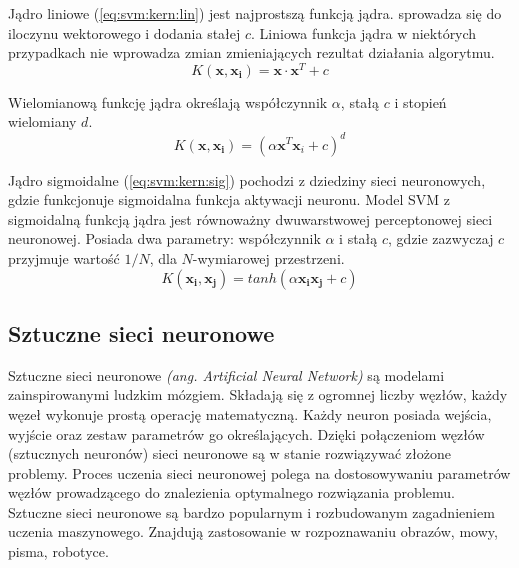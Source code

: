 \documentclass[a4paper,12pt,twoside,openany]{report}
\newcommand{\ang}[1]{\textit{(ang. #1)}}
\newcommand{\Eq}[1]{(\ref{#1})}
\renewcommand{\vec}[1]{\bm{#1}}
\begin{document}
Jądro liniowe \Eq{eq:svm:kern:lin} jest najprostszą funkcją jądra. 
sprowadza się do iloczynu wektorowego i dodania stałej $c$.
Liniowa funkcja jądra w niektórych przypadkach nie wprowadza zmian zmieniających rezultat działania algorytmu.
\begin{equation}
	\label{eq:svm:kern:lin}
	K(\vec x, \vec{x_i}) = \vec x \cdot \vec x ^ T + c
\end{equation}

Wielomianową funkcję jądra określają współczynnik $\alpha$, stałą $c$ i stopień wielomiany $d$.
\begin{equation}
	\label{eq:svm:kern:poly}
	K(\vec x, \vec{x_i}) = (\alpha \vec x^T \vec x_i + c)^d 
\end{equation}

Jądro sigmoidalne \Eq{eq:svm:kern:sig} pochodzi z dziedziny sieci neuronowych,
gdzie funkcjonuje sigmoidalna funkcja aktywacji neuronu. 
Model SVM z sigmoidalną funkcją jądra jest równoważny dwuwarstwowej perceptonowej sieci neuronowej.
Posiada dwa parametry: współczynnik $\alpha$ i stałą $c$, gdzie zazwyczaj $c$ przyjmuje wartość $1/N$,
dla $N$-wymiarowej przestrzeni.
\begin{equation}
	\label{eq:svm:kern:sig}
	K(\vec{x_i}, \vec{x_j}) = tanh( \alpha \vec{x_i}  \vec{x_j} + c)
\end{equation}
\subsection{Sztuczne sieci neuronowe}
Sztuczne sieci neuronowe \ang{Artificial Neural Network} są modelami zainspirowanymi ludzkim mózgiem.
Składają się z ogromnej liczby węzłów, każdy węzeł wykonuje prostą operację matematyczną.
Każdy neuron posiada wejścia, wyjście oraz zestaw parametrów go określających. 
Dzięki połączeniom węzłów (sztucznych neuronów) sieci neuronowe są w stanie rozwiązywać złożone problemy.
Proces uczenia sieci neuronowej polega na dostosowywaniu parametrów węzłów prowadzącego do znalezienia optymalnego rozwiązania problemu.
Sztuczne sieci neuronowe są bardzo popularnym i rozbudowanym zagadnieniem uczenia maszynowego.
Znajdują zastosowanie w rozpoznawaniu obrazów, mowy, pisma, robotyce. 
\end{document}
